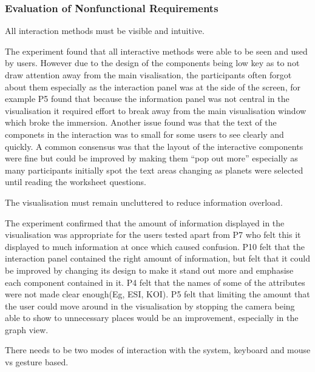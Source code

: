 \subsubsection{Evaluation of Nonfunctional Requirements}
\begin{enumerate}
 {\bf\item[R6.] All interaction methods must be visible and intuitive.}
 
The experiment found that all interactive methods were able to be seen and used
by users. However due to the design of the components being low key as to not
draw attention away from the main visalisation, the participants often forgot
about them especially as the interaction panel was at the side of the screen,
for example P5 found that because the information panel was not central in the
visualisation
it required effort to break away from the main visualisation window which broke
the immersion. Another issue found was that the text of the componets in the
interaction was to small for some users to see clearly and quickly.
A common consensus was that the layout of the interactive components were fine
but could be improved by making them “pop out more” especially as many
participants initially spot the text areas changing as planets were selected
until reading the worksheet questions.
 
{\bf \item[R7.] The visualisation must remain uncluttered to reduce information
overload.}

The experiment confirmed that the amount of information displayed in the
visualisation was appropriate for the users tested apart from P7 who felt this
it displayed to much information at once which caused confusion. P10 felt that
the interaction panel contained the right amount of information, but felt that
it could be improved by changing its design to make it stand out more and
emphasise each component contained in it. P4 felt that the names of some of the
attributes were not made clear enough(Eg, ESI, KOI). P5 felt that limiting the
amount that the user could move around in the visualisation by stopping the
camera being able to show to unnecessary places would be an improvement,
especially in the graph view.

{\bf \item[R8.]  There needs to be two modes of interaction with the system,
keyboard and mouse vs gesture based.}


\end{enumerate}
